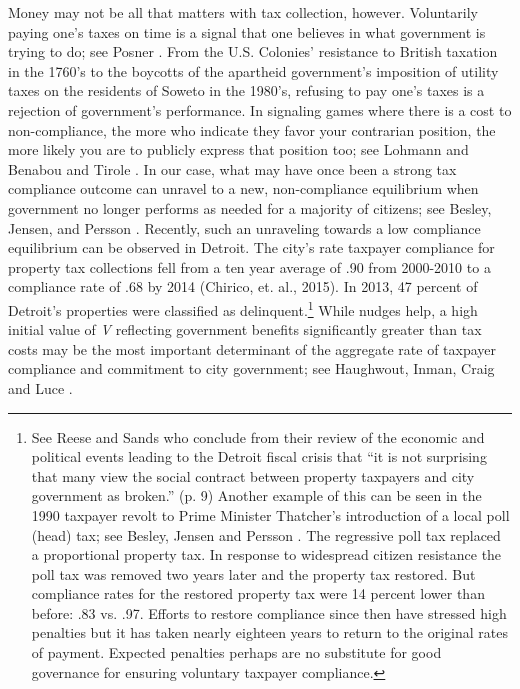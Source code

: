 Money may not be all that matters with tax collection, however.
Voluntarily paying one's taxes on time is a signal that one believes
in what government is trying to do; see Posner
\citeyearpar{Posner-00}. From the
U.S. Colonies' resistance to British taxation in the 1760's to the
boycotts of the apartheid government's imposition of utility taxes on the residents of Soweto in the 1980's, refusing to pay one's
taxes is a rejection of government's performance.  In signaling games where there is a cost to
non-compliance, the more who indicate they favor your contrarian
position, the more likely you are to publicly express that position
too; see Lohmann \citeyearpar{lohmann1994dynamics} and Benabou and Tirole
\citeyearpar{benabou2011laws}.  In our case, what may have once been a
strong tax compliance outcome can unravel to a new, non-compliance
equilibrium when government no longer performs as needed for a majority of citizens; see Besley, Jensen, and Persson
\citeyearpar{besley2015norms}.  Recently, such an unraveling towards a
low compliance equilibrium can be observed in Detroit. The city's rate
taxpayer compliance for property tax collections fell from a ten year
average of .90 from 2000-2010 to a compliance rate of .68 by 2014
(Chirico, et. al., 2015).  In 2013, 47 percent of
Detroit's properties were classified as delinquent.\footnote{See Reese
  and Sands \citeyearpar{reese2013no} who conclude from their review of
  the economic and political events leading to the Detroit fiscal
  crisis that ``it is not surprising that many view the social
  contract between property taxpayers and city government as broken.''
  (p. 9) Another example of this can be seen in the 1990 taxpayer
  revolt to Prime Minister Thatcher's introduction of a local poll
  (head) tax; see Besley, Jensen and Persson
  \citeyearpar{besley2015norms}.  The regressive poll tax replaced a
  proportional property tax.  In response to widespread citizen
  resistance the poll tax was removed two years later and the property
  tax restored.  But compliance rates for the restored property tax
  were 14 percent lower than before: .83 vs. .97.  Efforts to restore
  compliance since then have stressed high penalties but it has taken
  nearly eighteen years to return to the original rates of payment.
  Expected penalties perhaps are no substitute for good governance for
  ensuring voluntary taxpayer compliance.} While nudges help, a high initial value of \textit{V} reflecting government benefits significantly greater than tax costs may be the most important determinant of the aggregate rate of taxpayer compliance and commitment to city government; see Haughwout, Inman, Craig and Luce \citeyearpar{haughwout2004local}.

